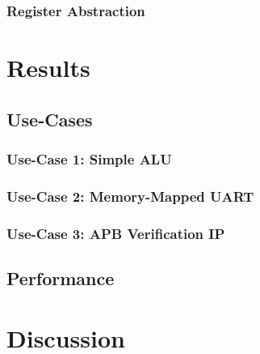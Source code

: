 \documentclass[12pt]{report}
\begin{document}
\subsection{Register Abstraction} %

\chapter{Results} %

\section{Use-Cases} %

\subsection{Use-Case 1: Simple ALU} %

\subsection{Use-Case 2: Memory-Mapped UART} %

\subsection{Use-Case 3: APB Verification IP} %

\section{Performance} %

\chapter{Discussion} %
\end{document}
